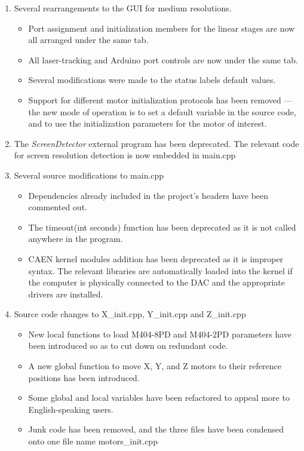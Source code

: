 \documentclass[a4paper,12pt]{article}
\begin{document}
\begin{enumerate}
	\item Several rearrangements to the GUI for medium resolutions.
	\begin{itemize}
		\item Port assignment and initialization members for the linear stages are now all arranged under the same tab.
		\item All laser-tracking and Arduino port controls are now under the same tab.
		\item Several modifications were made to the status labels default values.
		\item Support for different motor initialization protocols has been removed --- the new mode of operation is to set a default variable in the source code, and to use the initialization parameters for the motor of interest.
	\end{itemize}
	\item The \textit{ScreenDetector} external program has been deprecated. The relevant code for screen resolution detection is now embedded in main.cpp 
	\item Several source modifications to main.cpp
	\begin{itemize}
		\item Dependencies already included in the project's headers have been commented out.
		\item The timeout(int seconds) function has been deprecated as it is not called anywhere in the program.
		\item CAEN kernel modules addition has been deprecated as it is improper syntax. The relevant libraries are automatically loaded into the kernel if the computer is physically connected to the DAC and the appropriate drivers are installed.
	\end{itemize}
	\item Source code changes to X\_init.cpp, Y\_init.cpp and Z\_init.cpp
	\begin{itemize}
		\item New local functions to load M404-8PD and M404-2PD parameters have been introduced so as to cut down on redundant code.
		\item A new global function to move X, Y, and Z motors to their reference positions has been introduced.
		\item Some global and local variables have been refactored to appeal more to English-speaking users.
		\item Junk code has been removed, and the three files have been condensed onto one file name motors\_init.cpp

\end{itemize}
\end{enumerate}
\end{document}
